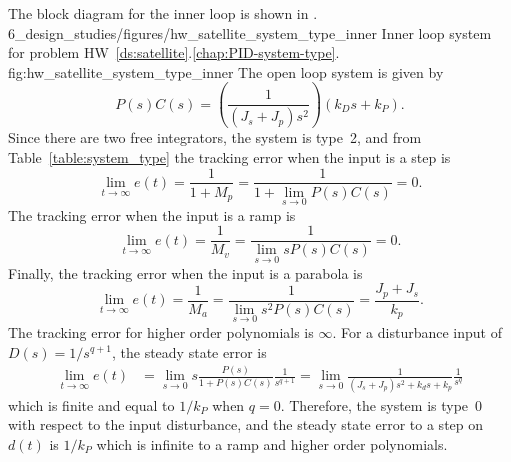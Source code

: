 
The block diagram for the inner loop is shown in .
	{6_design_studies/figures/hw_satellite_system_type_inner}
	{Inner loop system for problem HW~\ref{ds:satellite}.\ref{chap:PID-system-type}.}
	{fig:hw_satellite_system_type_inner}
The open loop system is given by
\[
P(s)C(s) = \left(\frac{1}{(J_s + J_p)s^2}\right)\left(k_Ds+k_P\right).
\]
Since there are two free integrators, the system is type~2, and from Table~\ref{table:system_type} the tracking error when the input is a step is \[
\lim_{t\to\infty}e(t) = \frac{1}{1+M_p} = \frac{1}{1+\lim_{s\to 0} P(s)C(s)} = 0.
\]
The tracking error when the input is a ramp is \[
\lim_{t\to\infty}e(t) = \frac{1}{M_v} = \frac{1}{\lim_{s\to 0} sP(s)C(s)} = 0.
\]
Finally, the tracking error when the input is a parabola is \[
\lim_{t\to\infty}e(t) = \frac{1}{M_a} = \frac{1}{\lim_{s\to 0} s^2P(s)C(s)} = \frac{J_p + J_s}{k_p}.
\]
The tracking error for higher order polynomials is $\infty$.
For a disturbance input of $D(s)=1/s^{q+1}$, the steady state error is
\begin{align*}
\lim_{t\to\infty}e(t) &= \lim_{s\to 0}s\frac{P(s)}{1+P(s)C(s)}\frac{1}{s^{q+1}} 
= \lim_{s\to 0}\frac{1}{(J_s+J_p)s^2+k_ds+k_p}\frac{1}{s^q}
\end{align*}
which is finite and equal to $1/k_P$ when $q=0$.  Therefore, the system is type~0 with respect to the input disturbance, and the steady state error to a step on $d(t)$ is $1/k_P$ which is infinite to a ramp and higher order polynomials.


